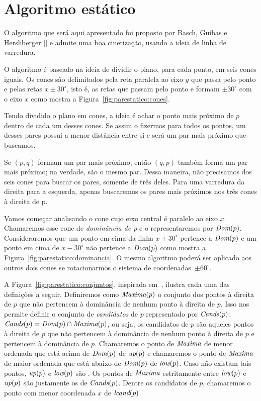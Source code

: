 
\FloatBarrier


\section{Algoritmo estático}\label{sec:algoritmo-estatico}

O algoritmo que será aqui apresentado foi proposto por Basch, Guibas
e Hershberger [\cite{BASCH19991}] e admite uma boa cinetização, usando a ideia de linha
de varredura.

O algoritmo é baseado na ideia de dividir o plano, para cada ponto, em seis cones iguais.
Os cones são delimitados pela reta paralela ao eixo $y$ que passa pelo ponto e pelas retas $x \pm
30^\circ$, isto é, as retas que passam pelo ponto e formam $\pm 30^\circ$ com o eixo $x$ como mostra a
Figura~\ref{fig:parestatico:cones}.



Tendo dividido o plano em cones, a ideia é achar o ponto mais próximo de $p$ dentro de cada um
desses cones.
Se assim o fizermos para todos os pontos, um desses pares possui a menor distância entre si e será
um par mais próximo que buscamos.

Se $(p, q)$ formam um par mais próximo, então $(q, p)$ também forma um par mais próximo;
na verdade, são o mesmo par.
Dessa maneira, não precisamos dos seis cones para buscar os pares, somente de três deles.
Para uma varredura da direita para a esquerda, apenas buscaremos os pares mais próximos nos três
cones à direita de p.

Vamos começar analisando o cone cujo eixo central é paralelo ao eixo $x$.
Chamaremos esse cone de \textit{dominância de p} e o representaremos por $\textit{Dom}(p)$.
Consideraremos que um ponto em cima da linha $x + 30^\circ$ pertence a $\textit{Dom}(p)$ e um ponto em cima de
$x - 30^\circ$ não pertence a $\textit{Dom}(p)$ como mostra a Figura~\ref{fig:parestatico:dominancia}.
O mesmo algoritmo poderá ser aplicado aos outros dois cones se rotacionarmos o sistema de
coordenadas~$\pm 60^\circ$.



A Figura~\ref{fig:parestatico:conjuntos}, inspirada em~\cite{BASCH19991}, ilustra cada uma das
definições a seguir.
Definiremos como $\textit{Maxima}(p)$ o conjunto dos pontos à direita de $p$ que não pertencem à
dominância de nenhum ponto à direita de $p$.
Isso nos permite definir o conjunto de \textit{candidatos} de $p$ representado por $\textit{Cands}(p)$:
$\textit{Cands}(p) = \textit{Dom}(p) \cap\textit{Maxima}(p)$, ou seja, os candidatos de $p$ são aqueles pontos à
direita de $p$ que não pertencem à dominância de nenhum ponto à direita de $p$ e
pertencem à dominância de $p$.
Chamaremos o ponto de $\textit{Maxima}$ de menor ordenada que está acima de $\textit{Dom}(p)$ de $\textit{up}(p)$ e
chamaremos o ponto de $\textit{Maxima}$ de maior ordenada que está abaixo de $\textit{Dom}(p)$ de $\textit{low}(p)$.
Caso não existam tais pontos, $\textit{up}(p)$ e $\textit{low}(p)$ são \nnull.
Os pontos de $\textit{Maxima}$ estritamente entre $\textit{low}(p)$ e $\textit{up}(p)$ são justamente os de $\textit{Cands}(p)$.
Dentre os candidatos de $p$, chamaremos o ponto com menor coordenada $x$ de $\textit{lcand}(p)$.

